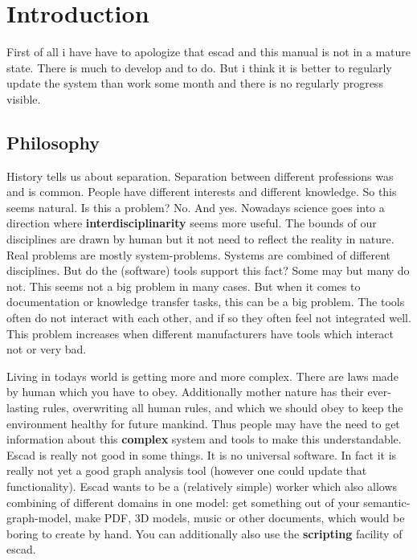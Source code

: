 \documentclass[a4paper, 12pt, openany]{scrbook}
\begin{document}
\chapter{Introduction}
First of all i have have to apologize that escad and this manual is not in a mature state. There is much to develop and to do. But i think it is better to regularly update the system than work some month and there is no regularly progress visible.
\section{Philosophy}
History tells us about separation. Separation between different professions was and is common. People have different interests and different knowledge. So this seems natural. Is this a problem? No. And yes. Nowadays science goes into a direction where \textbf{interdisciplinarity} seems more useful. The bounds of our disciplines are drawn by human but it not need to reflect the reality in nature. Real problems are mostly system-problems. Systems are combined of different disciplines. But do the (software) tools support this fact? Some may but many do not. This seems not a big problem in many cases. But when it comes to documentation or knowledge transfer tasks, this can be a big problem. The tools often do not interact with each other, and if so they often feel not integrated well. This problem increases when different manufacturers have tools which interact not or very bad.

Living in todays world is getting more and more complex. There are laws made by human which you have to obey. Additionally mother nature has their ever-lasting rules, overwriting all human rules, and which we should obey to keep the environment healthy for future mankind. Thus people may have the need to get information about this \textbf{complex} system and tools to make this understandable. Escad is really not good in some things. It is no universal software. In fact it is really not yet a good graph analysis tool (however one could update that functionality). Escad wants to be a (relatively simple) worker which also allows combining of different domains in one model: get something out of your semantic-graph-model, make PDF, 3D models, music or other documents, which would be boring to create by hand. You can additionally also use the \textbf{scripting} facility of escad.
\end{document}
